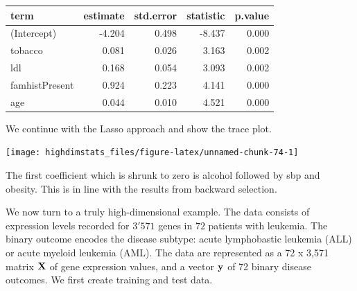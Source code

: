 \documentclass[
]{book}
\newenvironment{Shaded}{\begin{snugshade}}{\end{snugshade}}
\newcommand{\AttributeTok}[1]{\textcolor[rgb]{0.77,0.63,0.00}{#1}}
\newcommand{\ConstantTok}[1]{\textcolor[rgb]{0.00,0.00,0.00}{#1}}
\newcommand{\DecValTok}[1]{\textcolor[rgb]{0.00,0.00,0.81}{#1}}
\newcommand{\FunctionTok}[1]{\textcolor[rgb]{0.00,0.00,0.00}{#1}}
\newcommand{\NormalTok}[1]{#1}
\newcommand{\OtherTok}[1]{\textcolor[rgb]{0.56,0.35,0.01}{#1}}
\newcommand{\SpecialCharTok}[1]{\textcolor[rgb]{0.00,0.00,0.00}{#1}}
\newcommand{\StringTok}[1]{\textcolor[rgb]{0.31,0.60,0.02}{#1}}
\begin{document}
\begin{tabular}{lrrrr}
\toprule
term & estimate & std.error & statistic & p.value\\
\midrule
(Intercept) & -4.204 & 0.498 & -8.437 & 0.000\\
tobacco & 0.081 & 0.026 & 3.163 & 0.002\\
ldl & 0.168 & 0.054 & 3.093 & 0.002\\
famhistPresent & 0.924 & 0.223 & 4.141 & 0.000\\
age & 0.044 & 0.010 & 4.521 & 0.000\\
\bottomrule
\end{tabular}

We continue with the Lasso approach and show the trace plot.

\begin{Shaded}
\end{Shaded}

\begin{center}\texttt{[image: highdimstats\_files/figure-latex/unnamed-chunk-74-1]} \end{center}

The first coefficient which is shrunk to zero is alcohol followed by sbp and obesity. This is in line with the results from backward selection.

We now turn to a truly high-dimensional example. The data consists of expression levels recorded for \(3'571\) genes in \(72\) patients with leukemia. The binary outcome encodes the disease subtype: acute lymphobastic leukemia (ALL) or acute myeloid leukemia (AML). The data are represented as a 72 x 3,571 matrix \(\bf X\) of gene expression values, and a vector \(\bf y\) of 72 binary disease outcomes. We first create training and test data.
\end{document}
